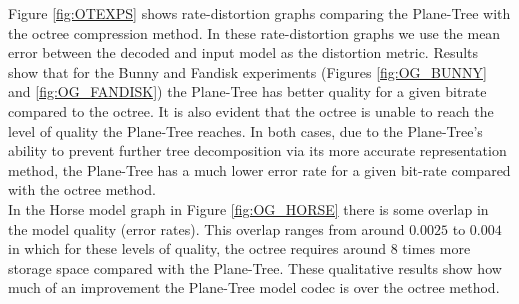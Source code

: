 Figure \ref{fig:OTEXPS} shows rate-distortion graphs comparing the Plane-Tree with the octree compression method. In these rate-distortion graphs we use the mean error between the decoded and input model as the distortion metric. Results show that for the Bunny and Fandisk experiments (Figures \ref{fig:OG_BUNNY} and \ref{fig:OG_FANDISK}) the Plane-Tree has better quality for a given bitrate compared to the octree. It is also evident that the octree is unable to reach the level of quality the Plane-Tree reaches. In both cases, due to the Plane-Tree's ability to prevent further tree decomposition via its more accurate representation method, the Plane-Tree has a much lower error rate for a given bit-rate compared with the octree method. \\

In the Horse model graph in Figure \ref{fig:OG_HORSE} there is some overlap in the model quality (error rates). This overlap ranges from around $0.0025$ to $0.004$ in which for these levels of quality, the octree requires around 8 times more storage space compared with the Plane-Tree. These qualitative results show how much of an improvement the Plane-Tree model codec is over the octree method. \\

